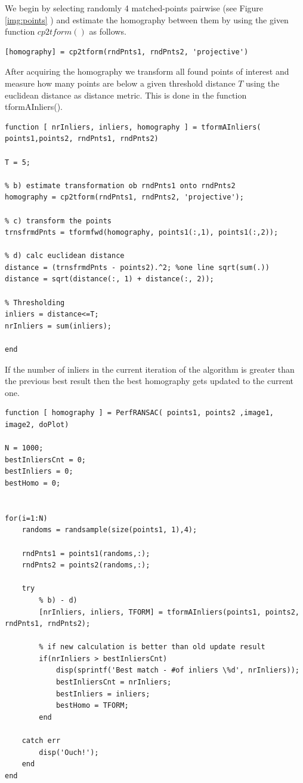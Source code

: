 \documentclass[subfigure,epsfig,fleqn,float,numbers=noenddot]{scrartcl}
\begin{document}
\par We begin by selecting randomly 4 matched-points pairwise (see Figure \ref{img:points} ) and estimate the homography between them by using the given function $cp2tform()$ as follows.
\begin{lstlisting}
[homography] = cp2tform(rndPnts1, rndPnts2, 'projective') 
\end{lstlisting}
After acquiring the homography we transform all found points of interest and measure how many points are below a given threshold distance $T$ using the euclidean distance as distance metric. This is done in the function tformAInliers(). 
\begin{lstlisting}
function [ nrInliers, inliers, homography ] = tformAInliers( points1,points2, rndPnts1, rndPnts2)

T = 5;

% b) estimate transformation ob rndPnts1 onto rndPnts2
homography = cp2tform(rndPnts1, rndPnts2, 'projective');

% c) transform the points 
trnsfrmdPnts = tformfwd(homography, points1(:,1), points1(:,2));

% d) calc euclidean distance
distance = (trnsfrmdPnts - points2).^2; %one line sqrt(sum(.))
distance = sqrt(distance(:, 1) + distance(:, 2));

% Thresholding
inliers = distance<=T;
nrInliers = sum(inliers);

end
\end{lstlisting}

\hspace{5mm}

If the number of inliers in the current iteration of the algorithm is greater than the previous best result then the best homography gets updated to the current one. 

\hspace{0.5mm}

\begin{lstlisting}
function [ homography ] = PerfRANSAC( points1, points2 ,image1, image2, doPlot)

N = 1000;
bestInliersCnt = 0;
bestInliers = 0; 
bestHomo = 0;


for(i=1:N)
    randoms = randsample(size(points1, 1),4);
    
    rndPnts1 = points1(randoms,:);
    rndPnts2 = points2(randoms,:);
        
    try
        % b) - d)
        [nrInliers, inliers, TFORM] = tformAInliers(points1, points2, rndPnts1, rndPnts2);
        
        % if new calculation is better than old update result
        if(nrInliers > bestInliersCnt)
            disp(sprintf('Best match - #of inliers \%d', nrInliers));
            bestInliersCnt = nrInliers;
            bestInliers = inliers; 
            bestHomo = TFORM;
        end
        
    catch err
        disp('Ouch!');
    end
end

\end{lstlisting}
\end{document}
